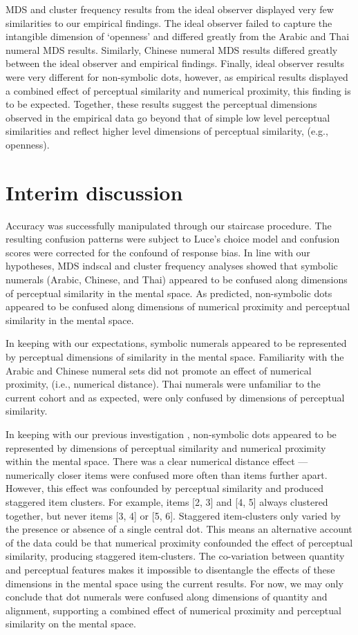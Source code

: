 MDS and cluster frequency results from the ideal observer displayed very few similarities to our empirical findings. The ideal observer failed to capture the intangible dimension of `openness' and differed greatly from the Arabic and Thai numeral MDS results. Similarly, Chinese numeral MDS results differed greatly between the ideal observer and empirical findings. Finally, ideal observer results were very different for non-symbolic dots, however, as empirical results displayed a combined effect of perceptual similarity and numerical proximity, this finding is to be expected. Together, these results suggest the perceptual dimensions observed in the empirical data go beyond that of simple low level perceptual similarities and reflect higher level dimensions of perceptual similarity, (e.g., openness).

\section{Interim discussion}
Accuracy was successfully manipulated through our staircase procedure. The resulting confusion patterns were subject to Luce's choice model and confusion scores were corrected for the confound of response bias. In line with our hypotheses, MDS indscal and cluster frequency analyses showed that symbolic numerals (Arabic, Chinese, and Thai) appeared to be confused along dimensions of perceptual similarity in the mental space. As predicted, non-symbolic dots appeared to be confused along dimensions of numerical proximity and perceptual similarity in the mental space.

In keeping with our expectations, symbolic numerals appeared to be represented by perceptual dimensions of similarity in the mental space. Familiarity with the Arabic and Chinese numeral sets did not promote an effect of numerical proximity, (i.e., numerical distance). Thai numerals were unfamiliar to the current cohort and as expected, were only confused by dimensions of perceptual similarity. 

In keeping with our previous investigation \cite{garrettWheelTask}, non-symbolic dots appeared to be represented by dimensions of perceptual similarity and numerical proximity within the mental space. There was a clear numerical distance effect --- numerically closer items were confused more often than items further apart. However, this effect was confounded by perceptual similarity and produced staggered item clusters. For example, items [2, 3] and [4, 5] always clustered together, but never items [3, 4] or [5, 6]. Staggered item-clusters only varied by the presence or absence of a single central dot. This means an alternative account of the data could be that numerical proximity confounded the effect of perceptual similarity, producing staggered item-clusters. The co-variation between quantity and perceptual features makes it impossible to disentangle the effects of these dimensions in the mental space using the current results. For now, we may only conclude that dot numerals were confused along dimensions of quantity and alignment, supporting a combined effect of numerical proximity and perceptual similarity on the mental space.

